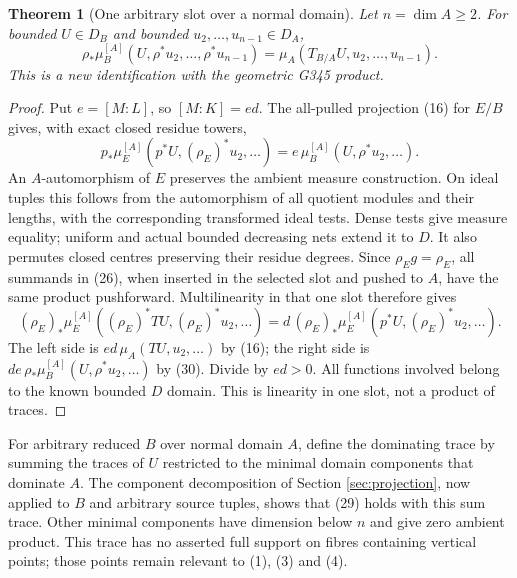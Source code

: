 \documentclass[11pt]{article}
\newtheorem{theorem}{Theorem}
\begin{document}
\begin{theorem}[One arbitrary slot over a normal domain]
Let \(n=\dim A\geq2\). For bounded \(U\in D_B\) and bounded
\(u_2,\ldots,u_{n-1}\in D_A\),
\[
 \rho_*\mu_B^{[A]}(U,\rho^*u_2,\ldots,\rho^*u_{n-1})
       =\mu_A(T_{B/A}U,u_2,\ldots,u_{n-1}).                    \tag{29}
\]
This is a new identification with the geometric G345 product.
\end{theorem}
\begin{proof}
Put \(e=[M:L]\), so \([M:K]=ed\).
The all-pulled projection (16) for \(E/B\) gives, with exact
closed residue towers,
\[
 p_*\mu_E^{[A]}(p^*U,(\rho_E)^*u_2,\ldots)
                 =e\,\mu_B^{[A]}(U,\rho^*u_2,\ldots).        \tag{30}
\]
An \(A\)-automorphism of \(E\) preserves the ambient measure
construction. On ideal tuples this follows from the
automorphism of all quotient modules and their lengths, with
the corresponding transformed ideal tests. Dense tests give
measure equality; uniform and actual bounded decreasing nets
extend it to \(D\). It also permutes closed centres preserving
their residue degrees. Since \(\rho_Eg=\rho_E\), all summands
in (26), when inserted in the selected slot and pushed to \(A\),
have the same product pushforward.
Multilinearity in that one slot therefore gives
\[
 (\rho_E)_*\mu_E^{[A]}((\rho_E)^*TU,(\rho_E)^*u_2,\ldots)
    =d\,(\rho_E)_*\mu_E^{[A]}(p^*U,(\rho_E)^*u_2,\ldots).
                                                               \tag{31}
\]
The left side is \(ed\,\mu_A(TU,u_2,\ldots)\) by (16);
the right side is \(de\,\rho_*\mu_B^{[A]}(U,\rho^*u_2,\ldots)\)
by (30). Divide by \(ed>0\).
All functions involved belong to the known bounded \(D\)
domain. This is linearity in one slot, not a product of traces.
\end{proof}

For arbitrary reduced \(B\) over normal domain \(A\), define
the dominating trace by summing the traces of \(U\) restricted
to the minimal domain components that dominate \(A\).
The component decomposition of Section \ref{sec:projection},
now applied to \(B\) and arbitrary source tuples, shows that
(29) holds with this sum trace. Other minimal components have
dimension below \(n\) and give zero ambient product.
This trace has no asserted full support on fibres containing
vertical points; those points remain relevant to (1), (3)
and (4).
\end{document}
